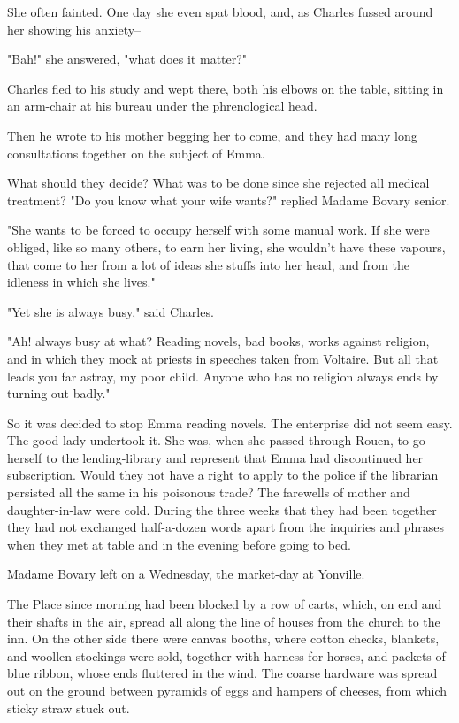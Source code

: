 \documentclass[11pt,twocolumn]{ltugboat}
\begin{document}
She often fainted. One day she even spat blood, and, as Charles fussed
around her showing his anxiety--

"Bah!" she answered, "what does it matter?"

Charles fled to his study and wept there, both his elbows on the table,
sitting in an arm-chair at his bureau under the phrenological head.

Then he wrote to his mother begging her to come, and they had many long
consultations together on the subject of Emma.

What should they decide? What was to be done since she rejected all
medical treatment? "Do you know what your wife wants?" replied Madame
Bovary senior.

"She wants to be forced to occupy herself with some manual work. If she
were obliged, like so many others, to earn her living, she wouldn't have
these vapours, that come to her from a lot of ideas she stuffs into her
head, and from the idleness in which she lives."

"Yet she is always busy," said Charles.

"Ah! always busy at what? Reading novels, bad books, works against
religion, and in which they mock at priests in speeches taken from
Voltaire. But all that leads you far astray, my poor child. Anyone who
has no religion always ends by turning out badly."

So it was decided to stop Emma reading novels. The enterprise did not
seem easy. The good lady undertook it. She was, when she passed through
Rouen, to go herself to the lending-library and represent that Emma had
discontinued her subscription. Would they not have a right to apply
to the police if the librarian persisted all the same in his poisonous
trade? The farewells of mother and daughter-in-law were cold. During
the three weeks that they had been together they had not exchanged
half-a-dozen words apart from the inquiries and phrases when they met at
table and in the evening before going to bed.

Madame Bovary left on a Wednesday, the market-day at Yonville.

The Place since morning had been blocked by a row of carts, which, on
end and their shafts in the air, spread all along the line of houses
from the church to the inn. On the other side there were canvas booths,
where cotton checks, blankets, and woollen stockings were sold,
together with harness for horses, and packets of blue ribbon, whose ends
fluttered in the wind. The coarse hardware was spread out on the ground
between pyramids of eggs and hampers of cheeses, from which sticky straw
stuck out.
\end{document}
